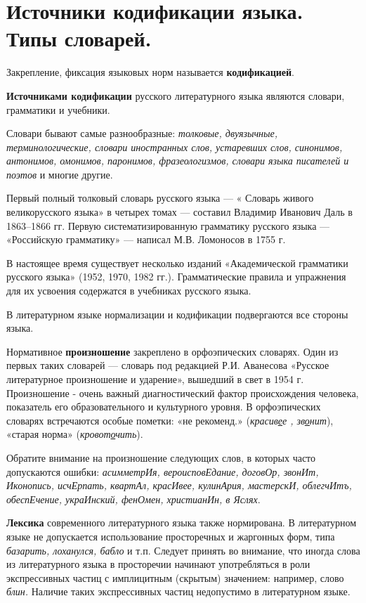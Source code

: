 \section{Источники кодификации языка. Типы словарей.}

Закрепление, фиксация языковых норм называется \textbf{кодификацией}.

\textbf{Источниками кодификации} русского литературного языка являются словари, грамматики и учебники.

Словари бывают самые разнообразные: \textit{толковые, двуязычные, терминологические, словари иностранных слов, устаревших
слов, синонимов, антонимов, омонимов, паронимов, фразеологизмов, словари языка писателей и поэтов} и многие другие.

Первый полный толковый словарь русского языка --- « Словарь живого великорусского языка» в четырех томах --- составил Владимир Иванович Даль в 1863--1866 гг.
Первую систематизированную грамматику русского языка --- «Российскую грамматику» --- написал М.В. Ломоносов в 1755 г.

В настоящее время существует несколько изданий «Академической грамматики русского языка» (1952, 1970, 1982 гг.).
Грамматические правила и упражнения для их усвоения содержатся в учебниках русского языка.

В литературном языке нормализации и кодификации подвергаются все стороны языка.

Нормативное \textbf{произношение} закреплено в орфоэпических словарях.
Один из первых таких словарей --- словарь под редакцией Р.И. Аванесова «Русское литературное произношение и ударение», вышедший в свет в 1954 г.
Произношение - очень важный диагностический фактор происхождения человека, показатель его образовательного и культурного уровня.
В орфоэпических словарях встречаются особые пометки: «не рекоменд.» (\textit{красив\underline{е}е , зв\underline{о}нит}), «старая норма» (\textit{кровот\underline{о}чить}).

Обратите внимание на произношение следующих слов, в которых часто допускаются ошибки: \textit{асимметрИя, вероисповЕдание, договОр, звонИт, Иконопись, исчЕрпать, квартАл, красИвее, кулинАрия, мастерскИ, облегчИтъ, обеспЕчение, украИнский, фенОмен, христианИн, в Яслях}.

\textbf{Лексика} современного литературного языка также нормирована.
В литературном языке не допускается использование просторечных и жаргонных форм, типа \textit{базарить, лоханулся, бабло} и т.п.
Следует принять во внимание, что иногда слова из литературного языка в просторечии начинают употребляться в роли экспрессивных частиц с имплицитным (скрытым) значением: например, слово \textit{блин.}
Наличие таких экспрессивных частиц недопустимо в литературном языке.

